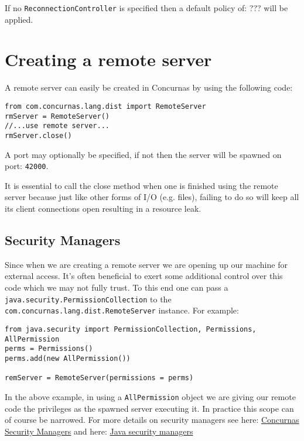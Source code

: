 \documentclass[conc-doc]{subfiles}
\begin{document}

If no \lstinline{ReconnectionController} is specified then a default policy of: ??? will be applied.

\section{Creating a remote server}	
A remote server can easily be created in Concurnas by using the following code:
\begin{lstlisting}
from com.concurnas.lang.dist import RemoteServer
rmServer = RemoteServer()
//...use remote server...
rmServer.close()
\end{lstlisting}

A port may optionally be specified, if not then the server will be spawned on port: \lstinline{42000}.

It is essential to call the close method when one is finished using the remote server because just like other forms of I/O (e.g. files), failing to do so will keep all its client connections open resulting in a resource leak.

\subsection{Security Managers}
\begin{sloppypar}
Since when we are creating a remote server we are opening up our machine for external access. It's often beneficial to exert some additional control over this code which we may not fully trust. To this end one can pass a \lstinline{java.security.PermissionCollection} to the \lstinline{com.concurnas.lang.dist.RemoteServer} instance. For example:
\end{sloppypar}

\begin{lstlisting}
from java.security import PermissionCollection, Permissions, AllPermission
perms = Permissions()
perms.add(new AllPermission())

remServer = RemoteServer(permissions = perms)
\end{lstlisting}

\begin{sloppypar}
In the above example, in using a \lstinline{AllPermission} object we are giving our remote code the privileges as the spawned server executing it. In practice this scope can of course be narrowed. For more details on security managers see here: \hyperref[sec:Security Managers]{Concurnas Security Managers} and here: \href{https://docs.oracle.com/javase/8/docs/technotes/guides/security/spec/security-spec.doc3.html}{Java security managers}
\end{sloppypar}
\end{document}
